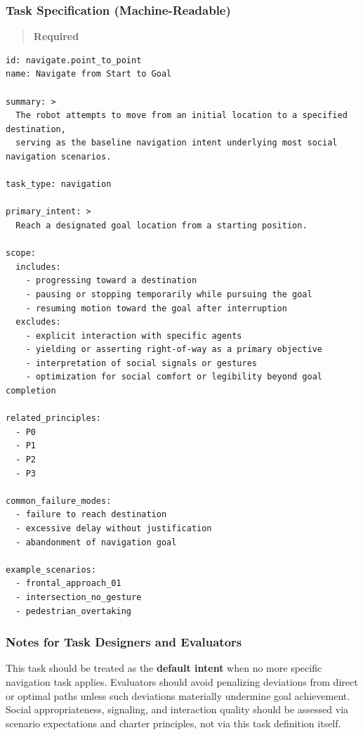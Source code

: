 \documentclass[utf8]{frontiers_suppmat} %
\begin{document}
\subsubsection{Task Specification
(Machine-Readable)}\label{task-specification-machine-readable}

\begin{quote}
\textbf{Required}
\end{quote}

\begin{lstlisting}[style=literatecard, label={task:navigate}]
id: navigate.point_to_point
name: Navigate from Start to Goal

summary: >
  The robot attempts to move from an initial location to a specified destination,
  serving as the baseline navigation intent underlying most social navigation scenarios.

task_type: navigation

primary_intent: >
  Reach a designated goal location from a starting position.

scope:
  includes:
    - progressing toward a destination
    - pausing or stopping temporarily while pursuing the goal
    - resuming motion toward the goal after interruption
  excludes:
    - explicit interaction with specific agents
    - yielding or asserting right-of-way as a primary objective
    - interpretation of social signals or gestures
    - optimization for social comfort or legibility beyond goal completion

related_principles:
  - P0
  - P1
  - P2
  - P3

common_failure_modes:
  - failure to reach destination
  - excessive delay without justification
  - abandonment of navigation goal

example_scenarios:
  - frontal_approach_01
  - intersection_no_gesture
  - pedestrian_overtaking
\end{lstlisting}

\subsubsection{Notes for Task Designers and
Evaluators}\label{notes-for-task-designers-and-evaluators}

This task should be treated as the \textbf{default intent} when no more
specific navigation task applies. Evaluators should avoid penalizing
deviations from direct or optimal paths unless such deviations
materially undermine goal achievement. Social appropriateness,
signaling, and interaction quality should be assessed via scenario
expectations and charter principles, not via this task definition
itself.
\end{document}
